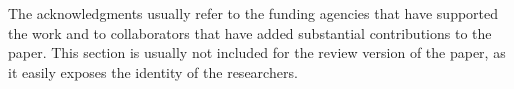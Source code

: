 The acknowledgments usually refer to the funding agencies that have supported the work and to collaborators that have added substantial contributions to the paper.
This section is usually not included for the review version of the paper, as it easily exposes the identity of the researchers.

